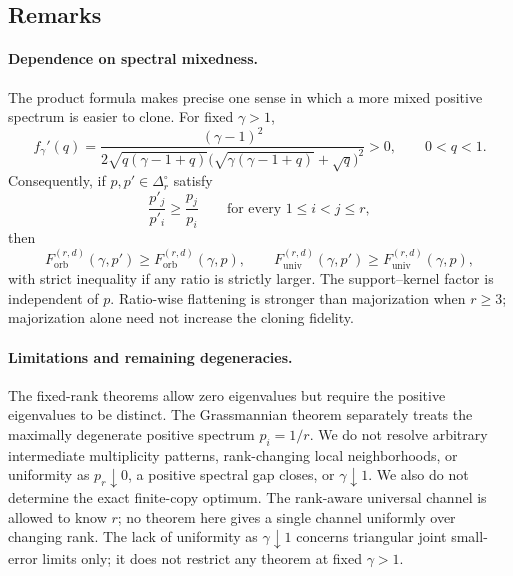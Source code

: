 \documentclass[11pt]{article}
\theoremstyle{remark}
\theoremstyle{plain}
\newcommand{\Forb}{F_{\mathrm{orb}}}
\newcommand{\Funiv}{F_{\mathrm{univ}}}
\begin{document}
\subsection{Remarks}
\label{sec:remarks}

\paragraph{Dependence on spectral mixedness.}
The product formula makes precise one sense in which a more mixed positive
spectrum is easier to clone.  For fixed \(\gamma>1\),
\[
  f_\gamma'(q)
  =\frac{(\gamma-1)^2}
  {2\sqrt{q(\gamma-1+q)}
   \bigl(\sqrt{\gamma(\gamma-1+q)}+\sqrt q\bigr)^2}>0,
  \qquad 0<q<1.
\]
Consequently, if \(p,p'\in\Delta_r^\circ\) satisfy
\[
  \frac{p'_j}{p'_i}\ge \frac{p_j}{p_i}
  \qquad\text{for every }1\le i<j\le r,
\]
then
\[
  \Forb^{(r,d)}(\gamma,p')\ge\Forb^{(r,d)}(\gamma,p),
  \qquad
  \Funiv^{(r,d)}(\gamma,p')\ge\Funiv^{(r,d)}(\gamma,p),
\]
with strict inequality if any ratio is strictly larger.  The
support--kernel factor is independent of \(p\).  Ratio-wise flattening is
stronger than majorization when \(r\ge3\); majorization alone need not
increase the cloning fidelity.

\paragraph{Limitations and remaining degeneracies.}
The fixed-rank theorems allow zero eigenvalues but require the positive
eigenvalues to be distinct.  The Grassmannian theorem separately treats the
maximally degenerate positive spectrum \(p_i=1/r\).  We do not resolve
arbitrary intermediate multiplicity patterns, rank-changing local
neighborhoods, or uniformity as \(p_r\downarrow0\), a positive spectral gap
closes, or \(\gamma\downarrow1\).  We also do not determine the exact
finite-copy optimum.  The rank-aware universal channel is allowed to know
\(r\); no theorem here gives a single channel uniformly over changing rank.
The lack of uniformity as \(\gamma\downarrow1\) concerns triangular joint
small-error limits only; it does not restrict any theorem at fixed
\(\gamma>1\).
\end{document}
